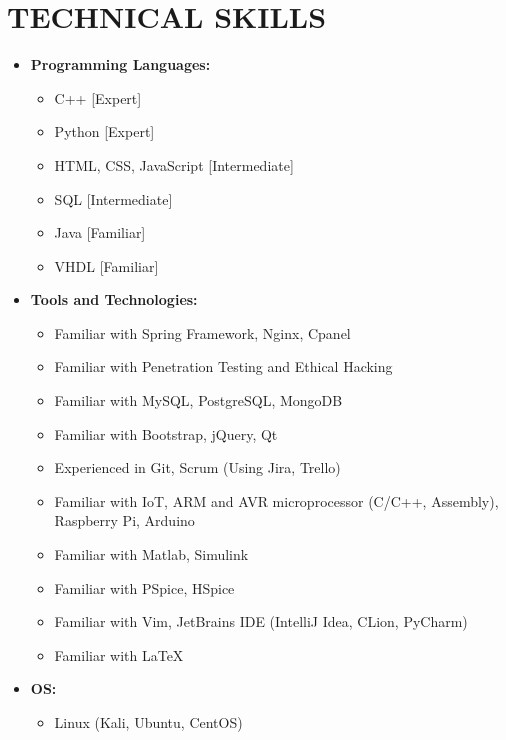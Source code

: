 \section{TECHNICAL SKILLS}
\begin{itemize}
	\item \textbf{Programming Languages:} 
		\begin{itemize}
			\item C++ [Expert]
			\item Python [Expert]
			\item HTML, CSS, JavaScript [Intermediate]
			\item SQL [Intermediate]
			\item Java [Familiar]
			\item VHDL [Familiar]
		\end{itemize}
	
	\vspace{+1 em}
	\item \textbf{Tools and Technologies:} 
		\begin{itemize}
			\item Familiar with Spring Framework, Nginx, Cpanel
			\item Familiar with Penetration Testing and Ethical Hacking
			\item Familiar with MySQL, PostgreSQL, MongoDB
			\item Familiar with Bootstrap, jQuery, Qt
			
			\item Experienced in Git, Scrum (Using Jira, Trello) 
			
			\item Familiar with IoT, ARM and AVR microprocessor (C/C++, Assembly), Raspberry Pi, Arduino
			\item Familiar with Matlab, Simulink
			\item Familiar with PSpice, HSpice
			
			\item Familiar with Vim, JetBrains IDE (IntelliJ Idea, CLion, PyCharm)
			
			\item Familiar with \LaTeX
			
		\end{itemize}

	\vspace{+1 em}
	\item \textbf{OS:} 
		\begin{itemize}
			\item Linux (Kali, Ubuntu, CentOS)
		\end{itemize}
\end{itemize}

